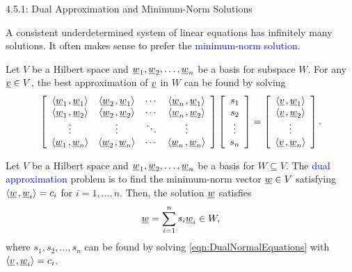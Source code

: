 \documentclass[10pt,english,aspectratio=169]{beamer}
\begin{document}
\begin{frame}[shrink=3]{4.5.1: Dual Approximation and Minimum-Norm Solutions}

A consistent underdetermined system of linear equations has infinitely many solutions.
It often makes sense to prefer the \textcolor{blue}{minimum-norm solution}.

\vspace{1.5mm}

Let $V$ be a Hilbert space and $\underline{w}_1 ,\underline{w}_2 , \ldots, \underline{w}_n$ be a basis for subspace $W$.
For any $\underline{v} \in V$, the best approximation of $\underline{v}$ in $W$ can be found by solving
\begin{equation} \label{eqn:DualNormalEquations}
\left[ \begin{array}{cccc}
{\left\langle  \underline{w}_1  \mskip2mu ,  \underline{w}_1  \right\rangle}
& {\left\langle  \underline{w}_2  \mskip2mu ,  \underline{w}_1  \right\rangle} & \cdots
& {\left\langle  \underline{w}_n  \mskip2mu ,  \underline{w}_1  \right\rangle} \\
{\left\langle  \underline{w}_1  \mskip2mu ,  \underline{w}_2  \right\rangle}
& {\left\langle  \underline{w}_2  \mskip2mu ,  \underline{w}_2  \right\rangle} & \cdots
& {\left\langle  \underline{w}_n  \mskip2mu ,  \underline{w}_2  \right\rangle} \\
\vdots & \vdots & \ddots & \vdots \\
{\left\langle  \underline{w}_1  \mskip2mu ,  \underline{w}_n  \right\rangle}
& {\left\langle  \underline{w}_2  \mskip2mu ,  \underline{w}_n  \right\rangle} & \cdots
& {\left\langle  \underline{w}_n  \mskip2mu ,  \underline{w}_n  \right\rangle}
\end{array} \right]
\left[ \begin{array}{c}
s_1 \\ s_2 \\ \vdots \\ s_n \end{array} \right]
= \left[ \begin{array}{c}
{\left\langle  \underline{v}  \mskip2mu ,  \underline{w}_1  \right\rangle} \\
{\left\langle  \underline{v}  \mskip2mu ,  \underline{w}_2  \right\rangle} \\ \vdots \\
{\left\langle  \underline{v}  \mskip2mu ,  \underline{w}_n  \right\rangle} \end{array} \right] .
\end{equation}

\vspace{-1mm}

\begin{theorem}
Let $V$ be a Hilbert space and $\underline{w}_1 ,\underline{w}_2 , \ldots, \underline{w}_n$ be a basis for $W\subseteq V$.
The \textcolor{blue}{dual approximation} problem is to find the minimum-norm vector $\underline{w}\in V$ satisfying ${\left\langle  \underline{w}  \mskip2mu ,  \underline{w}_i  \right\rangle} = c_i$ for $i=1,\ldots,n$.
Then, the solution $\underline{w}$ satisfies \vspace{-3mm}
\[ \vecnot{w} = \sum_{i=1}^n s_i \vecnot{w}_i \in W, \vspace{-2.75mm} \]
where $s_1,s_2,\ldots,s_n$ can be found by solving \eqref{eqn:DualNormalEquations} with ${\left\langle  \underline{v}  \mskip2mu ,  \underline{w}_i  \right\rangle} = c_i$.
\end{theorem}


\end{frame}
\end{document}
